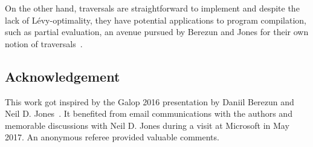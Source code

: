 \documentclass{elsarticle}
\theoremstyle{plain}
\theoremstyle{definition}
\begin{document}
On the other hand, traversals are straightforward to implement and despite the lack of L\'evy-optimality, they have potential applications to program compilation, such as partial evaluation, an avenue pursued by Berezun and Jones for their own notion of traversals~\cite{berezunjones_partialevalbytraversals}.


%






\subsection*{Acknowledgement}
This work got inspired by the Galop 2016 presentation by Daniil Berezun and Neil D. Jones~\cite{berezunjones_partialevalbytraversals}. It benefited from email communications with the authors and memorable discussions with Neil D. Jones during a visit at Microsoft in May 2017.
An anonymous referee provided valuable comments.


\end{document}
